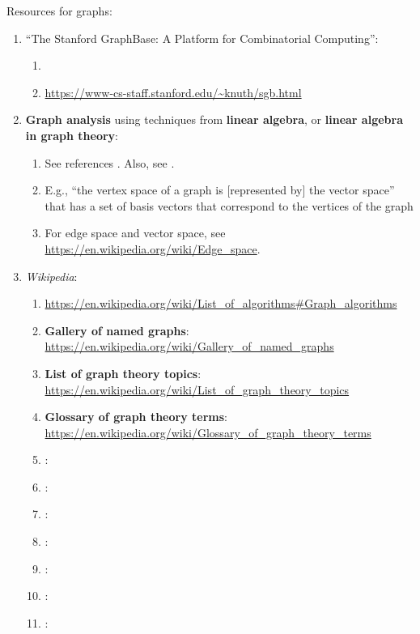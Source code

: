 Resources for graphs: \vspace{-0.3cm}
\begin{enumerate} \itemsep -4pt
\item ``The Stanford GraphBase: A Platform for Combinatorial Computing'': \vspace{-0.3cm}
	\begin{enumerate} \itemsep -2pt
	\item \cite{Knuth1993}
	\item \url{https://www-cs-staff.stanford.edu/~knuth/sgb.html}
	\end{enumerate}
\item {\bf Graph analysis} using techniques from {\bf linear algebra}, or {\bf linear algebra in graph theory}: \vspace{-0.3cm}
	\begin{enumerate} \itemsep -2pt
	\item See references \cite{Bapat2014,Brouwer2012,Bapat2010,Hogben2007,Biggs1974}. Also, see \cite{Lovasz2014}.
	\item E.g., ``the vertex space of a graph is [represented by] the vector space'' that has a set of basis vectors that correspond to the vertices of the graph \cite{WikipediaContributors2017a11}
	\item For edge space and vector space, see \url{https://en.wikipedia.org/wiki/Edge_space}.
	\end{enumerate}
\item {\it Wikipedia}: \vspace{-0.3cm}
	\begin{enumerate} \itemsep -2pt
	\item \url{https://en.wikipedia.org/wiki/List_of_algorithms#Graph_algorithms}
	\item {\bf Gallery of named graphs}: \url{https://en.wikipedia.org/wiki/Gallery_of_named_graphs}
	\item {\bf List of graph theory topics}: \url{https://en.wikipedia.org/wiki/List_of_graph_theory_topics}
	\item {\bf Glossary of graph theory terms}: \url{https://en.wikipedia.org/wiki/Glossary_of_graph_theory_terms}
	\item : \url{}
	\item : \url{}
	\item : \url{}
	\item : \url{}
	\item : \url{}
	\item : \url{}
	\item : \url{}

\end{enumerate}
\end{enumerate}
